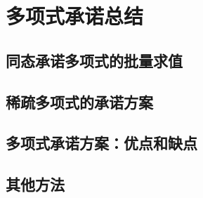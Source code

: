 \chapter{多项式承诺总结}\label{chp:16PC}

\section{同态承诺多项式的批量求值}\label{16.1}
\section{稀疏多项式的承诺方案}\label{16.2}
\section{多项式承诺方案：优点和缺点}\label{16.3}
\section{其他方法}\label{16.4}